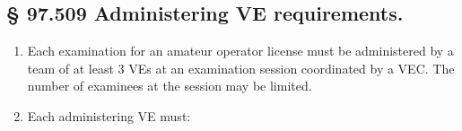 \documentclass[
  letterpaper,
  DIV=11,
  numbers=noendperiod]{scrreport}
\begin{document}
\hypertarget{administering-ve-requirements.}{%
\subsection*{§ 97.509 Administering VE
requirements.}\label{administering-ve-requirements.}}

\begin{enumerate}
\def\labelenumi{(\alph{enumi})}
\item
  Each examination for an amateur operator license must be administered
  by a team of at least 3 VEs at an examination session coordinated by a
  VEC. The number of examinees at the session may be limited.
\item
  Each administering VE must:
\end{enumerate}
\end{document}
